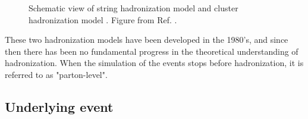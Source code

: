 \begin{figure}[h]
\begin{center}
\end{center}
 \caption{Schematic view of string hadronization model  and cluster hadronization model . Figure from Ref. \cite{Isildak:2013kfa}.}
  \label{fig:had_model}
\end{figure}


These two hadronization models have been developed in the 1980's, and since then there has been no fundamental progress in the theoretical understanding of hadronization. 
When the simulation of the events stops before hadronization, it is referred to as "parton-level".

\subsection{Underlying event}

